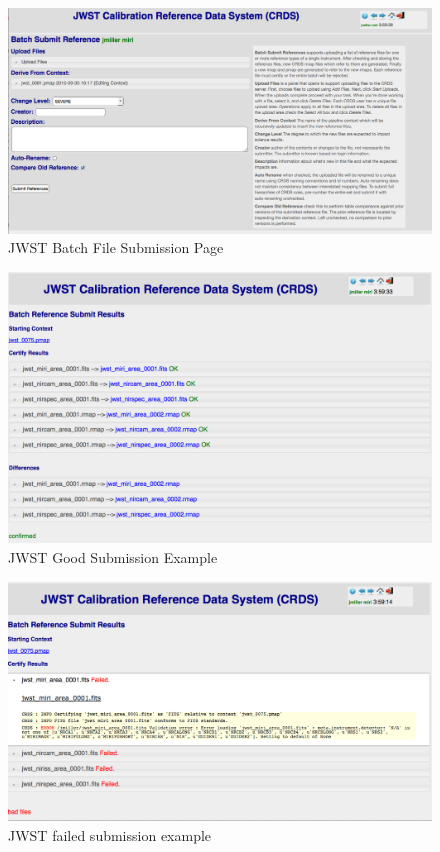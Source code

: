 \documentclass[final,authoryear,5p,times,twocolumn]{elsarticle}
\begin{document}
\begin{figure}[ht!]
\centering
\includegraphics[width=180mm]{JWST_Batch_File_Submission.png}
\caption{JWST Batch File Submission Page}
\label{fig:batchsubmission}
\end{figure}

\begin{figure}[ht!]
\centering
\includegraphics[width=180mm]{JWST_Good_Submission_Review_Page_(after_confirmation).png}
\caption{JWST Good Submission Example}
\label{fig:goodsubmissionreview}
\end{figure}

\begin{figure}[ht!]
\centering
\includegraphics[width=180mm]{JWST_Failed_Submission_DM_schema_violation.png}
\caption{JWST failed submission example}
\label{fig:failedsubmission}
\end{figure}
\end{document}
